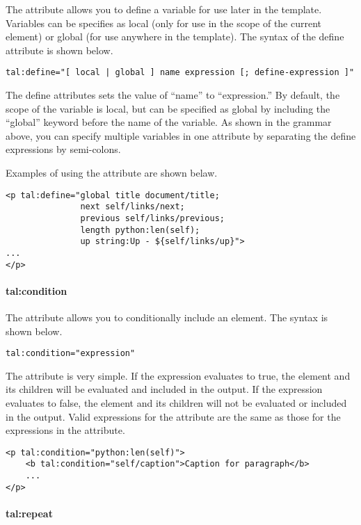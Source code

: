 The  attribute allows you to define a variable for use
later in the template.  Variables can be specifies as local (only for
use in the scope of the current element) or global (for use anywhere in
the template).  The syntax of the define attribute is shown below.
\begin{verbatim}
tal:define="[ local | global ] name expression [; define-expression ]"
\end{verbatim}

The define attributes sets the value of ``name'' to ``expression.''  
By default, the scope of the variable is local, but can be specified
as global by including the ``global'' keyword before the name of the 
variable.  As shown in the grammar above, you can specify multiple 
variables in one  attribute by separating the define
expressions by semi-colons.

Examples of using the  attribute are shown belaw.
\begin{verbatim}
<p tal:define="global title document/title; 
               next self/links/next;
               previous self/links/previous;
               length python:len(self);
               up string:Up - ${self/links/up}">
...
</p>
\end{verbatim}


\paragraph{tal:condition}

The  attribute allows you to conditionally include
an element.  The syntax is shown below.
\begin{verbatim}
tal:condition="expression"
\end{verbatim}

The  attribute is very simple.  If the expression
evaluates to true, the element and its children will be evaluated and 
included in the output.  If the expression evaluates to false, the element 
and its children will not be evaluated or included in the output.
Valid expressions for the  attribute are the same 
as those for the expressions in the  attribute.
\begin{verbatim}
<p tal:condition="python:len(self)">
    <b tal:condition="self/caption">Caption for paragraph</b>
    ...
</p>
\end{verbatim}


\paragraph{tal:repeat\label{sec:talrepeat}}

